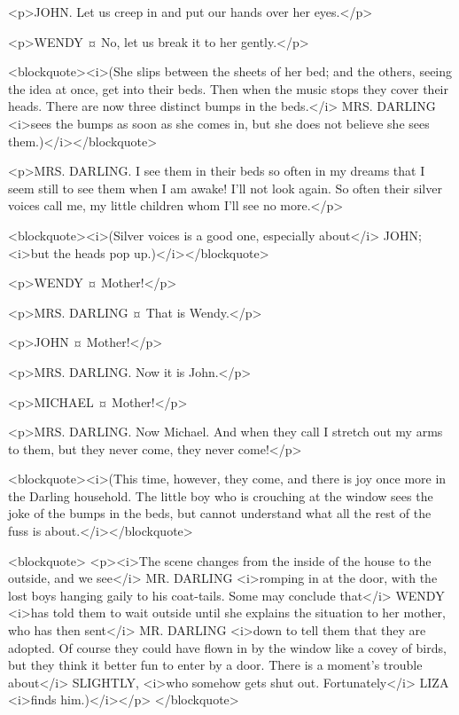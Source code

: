 <p>JOHN. Let us creep in and put our hands over her eyes.</p>

<p>WENDY ¤
No, let us break it to her gently.</p>

<blockquote><i>(She slips between the sheets of her bed; and the others, seeing the idea at once, get into their beds. Then when the music stops they cover their heads. There are now three distinct bumps in the beds.</i> MRS. DARLING <i>sees the bumps as soon as she comes in, but she does not believe she sees them.)</i></blockquote>

<p>MRS. DARLING. I see them in their beds so often in my dreams that I seem still to see them when I am awake! I'll not look again.
So often their silver voices call me, my little children whom I'll see no more.</p>

<blockquote><i>(Silver voices is a good one, especially about</i> JOHN; <i>but the heads pop up.)</i></blockquote>

<p>WENDY ¤
Mother!</p>

<p>MRS. DARLING ¤
That is Wendy.</p>

<p>JOHN ¤
Mother!</p>

<p>MRS. DARLING. Now it is John.</p>

<p>MICHAEL ¤
Mother!</p>

<p>MRS. DARLING. Now Michael. And when they call I stretch out my arms to them, but they never come, they never come!</p>

<blockquote><i>(This time, however, they come, and there is joy once more in the Darling household. The little boy who is crouching at the window sees the joke of the bumps in the beds, but cannot understand what all the rest of the fuss is about.</i></blockquote>

<blockquote> <p><i>The scene changes from the inside of the house to the outside, and we see</i> MR. DARLING <i>romping in at the door, with the lost boys hanging gaily to his coat-tails. Some may conclude that</i> WENDY <i>has told them to wait outside until she explains the situation to her mother, who has then sent</i> MR. DARLING <i>down to tell them that they are adopted. Of course they could have flown in by the window like a covey of birds, but they think it better fun to enter by a door. There is a moment's trouble about</i> SLIGHTLY, <i>who somehow gets shut out. Fortunately</i> LIZA <i>finds him.)</i></p> </blockquote>

